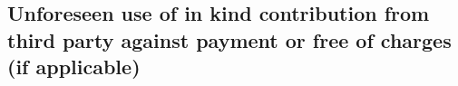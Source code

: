 \documentclass{deliverablereport}
\begin{document}
\subsection{Unforeseen use of in kind contribution from third party against payment or free 
of charges (if applicable)}

\end{document}
